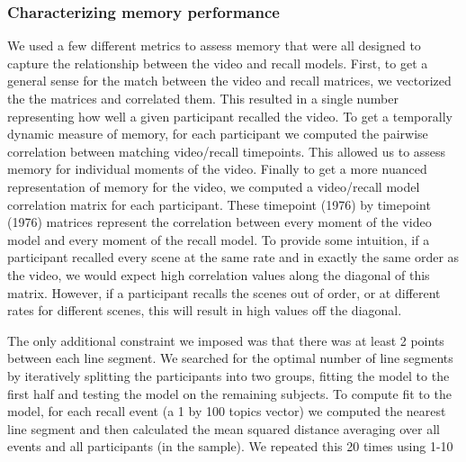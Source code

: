 \subsubsection{Characterizing memory performance}
We used a few different metrics to assess memory that were all designed to capture the relationship between the video and recall models.  First, to get a general sense for the match between the video and recall matrices, we vectorized the the matrices and correlated them.  This resulted in a single number representing how well a given participant recalled the video. To get a temporally dynamic measure of memory, for each participant we computed the pairwise correlation between matching video/recall timepoints.  This allowed us to assess memory for individual moments of the video. Finally to get a more nuanced representation of memory for the video, we computed a video/recall model correlation matrix for each participant. These timepoint (1976) by timepoint (1976) matrices represent the correlation between every moment of the video model and every moment of the recall model. To provide some intuition, if a participant recalled every scene at the same rate and in exactly the same order as the video, we would expect high correlation values along the diagonal of this matrix. However, if a participant recalls the scenes out of order, or at different rates for different scenes, this will result in high values off the diagonal.

The only additional constraint we imposed was that there was at least 2 points between each line segment.
We searched for the optimal number of line segments by iteratively splitting the participants into two groups, fitting the model to the first half and testing the model on the remaining subjects. To compute fit to the model, for each recall event (a 1 by 100 topics vector) we computed the nearest line segment and then calculated the mean squared distance averaging over all events and all participants (in the sample). We repeated this 20 times using 1-10

